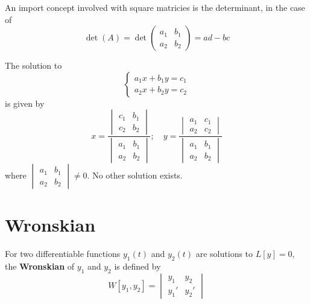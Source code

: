 \documentclass[twoside]{report}
\begin{document}
    \np
    \begin{definition}[Determinant]
        An import concept involved with square matricies is the determinant, in the case of
        \begin{equation}
            \det(A) = 
        \det\begin{pmatrix}
            a_{1} & b_{1}\\
            a_{2} & b_{2}
        \end{pmatrix} = ad - bc
        \end{equation}
    \end{definition}
    \begin{btheorem}
        The solution to
        \begin{equation}
            \begin{cases}
                a_{1}x + b_{1}y = c_{1}\\
                a_{2}x + b_{2}y = c_{2}
            \end{cases}
        \end{equation}
        is given by
        \begin{equation}
            x = \frac{\begin{vmatrix}
                c_{1} & b_{1}\\
                c_{2} & b_{2}
            \end{vmatrix}}{\begin{vmatrix}
                a_{1} & b_{1}\\
                a_{2} & b_{2}
            \end{vmatrix}};\quad
            y = \frac{\begin{vmatrix}
                a_{1} & c_{1}\\
                a_{2} & c_{2}
            \end{vmatrix}}{\begin{vmatrix}
                a_{1} & b_{1}\\
                a_{2} & b_{2}
            \end{vmatrix}}
        \end{equation}
        where $\begin{vmatrix}a_{1} & b_{1}\\a_{2} & b_{2}\end{vmatrix} \neq 0$. No other solution exists.
    \end{btheorem}
    \section{Wronskian}
    \begin{definition}[Wronskian]
        For two differentiable functions $y_{1}(t)$ and $y_{2}(t)$ are solutions to $L[y]= 0$, the \textbf{Wronskian} of $y_{1}$ and $y_{2}$ is defined by
        \begin{equation}
            W[y_{1}, y_{2}] = \begin{vmatrix}
                y_{1} & y_{2}\\
                y_{1}' & y_{2}'
            \end{vmatrix}
        \end{equation}
    \end{definition}
    \np
\end{document}

